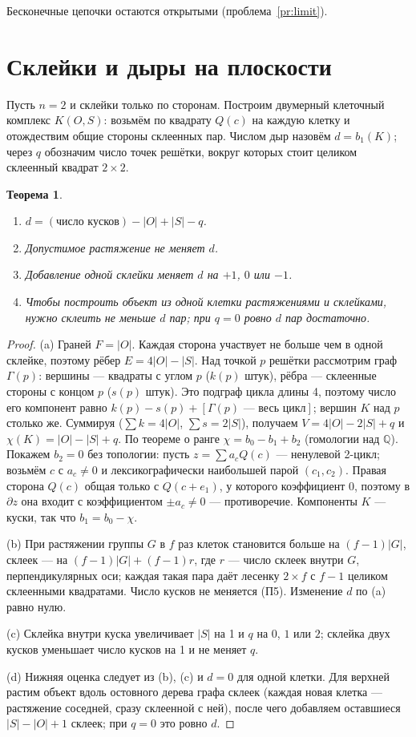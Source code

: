 \documentclass[11pt,a4paper]{article}
\theoremstyle{plain}
\newtheorem{theorem}{Теорема}
\theoremstyle{definition}
\theoremstyle{remark}
\begin{document}
Бесконечные цепочки остаются открытыми (проблема~\ref{pr:limit}).

\section{Склейки и дыры на плоскости}\label{sec:holes}

Пусть $n=2$ и склейки только по сторонам. Построим двумерный клеточный комплекс $K(O,S)$: возьмём по квадрату $Q(c)$ на каждую клетку и отождествим общие стороны склеенных пар. Числом дыр назовём $d=b_1(K)$; через $q$ обозначим число точек решётки, вокруг которых стоит целиком склеенный квадрат $2\times2$.

\begin{theorem}\label{thm:holes}
\begin{enumerate}[label=\upshape(\alph*)]
\item $d=(\text{число кусков})-|O|+|S|-q$.
\item Допустимое растяжение не меняет $d$.
\item Добавление одной склейки меняет $d$ на $+1$, $0$ или $-1$.
\item Чтобы построить объект из одной клетки растяжениями и склейками, нужно склеить не меньше $d$ пар; при $q=0$ ровно $d$ пар достаточно.
\end{enumerate}
\end{theorem}
\begin{proof}
(a) Граней $F=|O|$. Каждая сторона участвует не больше чем в одной склейке, поэтому рёбер $E=4|O|-|S|$. Над точкой $p$ решётки рассмотрим граф $\Gamma(p)$: вершины — квадраты с углом $p$ ($k(p)$ штук), рёбра — склеенные стороны с концом $p$ ($s(p)$ штук). Это подграф цикла длины 4, поэтому число его компонент равно $k(p)-s(p)+[\Gamma(p)\text{ — весь цикл}]$; вершин $K$ над $p$ столько же. Суммируя ($\sum k=4|O|$, $\sum s=2|S|$), получаем $V=4|O|-2|S|+q$ и $\chi(K)=|O|-|S|+q$. По теореме о ранге $\chi=b_0-b_1+b_2$ (гомологии над $\mathbb Q$). Покажем $b_2=0$ без топологии: пусть $z=\sum a_cQ(c)$ — ненулевой 2-цикл; возьмём $c$ с $a_c\ne0$ и лексикографически наибольшей парой $(c_1,c_2)$. Правая сторона $Q(c)$ общая только с $Q(c+e_1)$, у которого коэффициент $0$, поэтому в $\partial z$ она входит с коэффициентом $\pm a_c\ne0$ — противоречие. Компоненты $K$ — куски, так что $b_1=b_0-\chi$.

(b) При растяжении группы $G$ в $f$ раз клеток становится больше на $(f-1)|G|$, склеек — на $(f-1)|G|+(f-1)r$, где $r$ — число склеек внутри $G$, перпендикулярных оси; каждая такая пара даёт лесенку $2\times f$ с $f-1$ целиком склеенными квадратами. Число кусков не меняется (П5). Изменение $d$ по (a) равно нулю.

(c) Склейка внутри куска увеличивает $|S|$ на 1 и $q$ на $0$, $1$ или $2$; склейка двух кусков уменьшает число кусков на 1 и не меняет $q$.

(d) Нижняя оценка следует из (b), (c) и $d=0$ для одной клетки. Для верхней растим объект вдоль остовного дерева графа склеек (каждая новая клетка — растяжение соседней, сразу склеенной с ней), после чего добавляем оставшиеся $|S|-|O|+1$ склеек; при $q=0$ это ровно $d$.
\end{proof}
\end{document}
